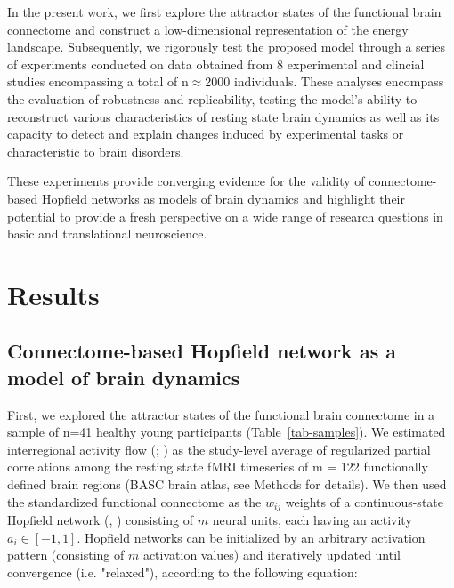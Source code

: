 \documentclass{article}
\begin{document}
In the present work, we first explore the attractor states of the functional brain connectome and construct a low-dimensional representation of the energy landscape.
Subsequently, we rigorously test the proposed model through a series of experiments conducted on data obtained from 8 experimental and clincial studies encompassing a total of n$\approx$2000 individuals.
These analyses encompass the evaluation of robustness and replicability, testing the model's ability to reconstruct various characteristics of resting state brain dynamics as well as its capacity to detect and explain changes induced by experimental tasks or characteristic to brain disorders.

These experiments provide converging evidence for the validity of connectome-based Hopfield networks as models of brain dynamics and highlight their potential to provide a fresh perspective on a wide range of research questions in basic and translational neuroscience.

\section{Results}\label{Results}

\subsection{Connectome-based Hopfield network as a model of brain dynamics}\label{Connectome-based Hopfield network as a model of brain dynamics}

First, we explored the attractor states of the functional brain connectome in a sample of n=41 healthy young participants (Table~\ref{tab-samples}).
We estimated interregional activity flow (\href{https://doi.org/10.1038/nn.4406}{}; \href{https://doi.org/10.1038/s41467-017-01000-w}{}) as the study-level average of regularized partial correlations among the resting state fMRI timeseries of m = 122 functionally defined brain regions (BASC brain atlas, see Methods for details).
We then used the standardized functional connectome as the $w_{ij}$  weights of a continuous-state Hopfield network (\href{https://doi.org/10.1073/pnas.79.8.2554}{}, \href{https://doi.org/10.1162/neco.1994.6.3.459}{}) consisting of $m$ neural units, each having an activity $a_i \in [ -1,1]$.
Hopfield networks can be initialized by an arbitrary activation pattern (consisting of $m$ activation values) and iteratively updated until convergence (i.e. "relaxed"), according to the following equation:
\end{document}
